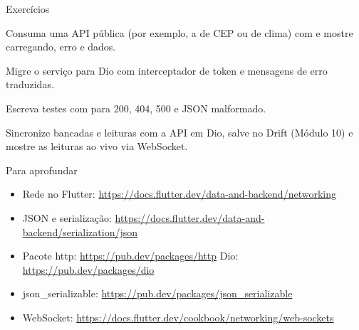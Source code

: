 \documentclass[aspectratio=169,10pt]{beamer}
\begin{document}
\begin{frame}{Exercícios}
  \begin{exercicio}
    Consuma uma API pública (por exemplo, a de CEP ou de clima) com  e mostre carregando, erro e dados.
  \end{exercicio}
  \begin{exercicio}
    Migre o serviço para Dio com interceptador de token e mensagens de erro traduzidas.
  \end{exercicio}
  \begin{exercicio}
    Escreva testes com  para 200, 404, 500 e JSON malformado.
  \end{exercicio}
  \begin{projeto}
    Sincronize bancadas e leituras com a API em Dio, salve no Drift (Módulo 10) e mostre as leituras ao vivo via WebSocket.
  \end{projeto}
\end{frame}

\begin{frame}{Para aprofundar}
  \small
  \begin{itemize}
    \item Rede no Flutter: \url{https://docs.flutter.dev/data-and-backend/networking}
    \item JSON e serialização: \url{https://docs.flutter.dev/data-and-backend/serialization/json}
    \item Pacote http: \url{https://pub.dev/packages/http} \quad Dio: \url{https://pub.dev/packages/dio}
    \item json\_serializable: \url{https://pub.dev/packages/json_serializable}
    \item WebSocket: \url{https://docs.flutter.dev/cookbook/networking/web-sockets}
  \end{itemize}
\end{frame}
\end{document}
